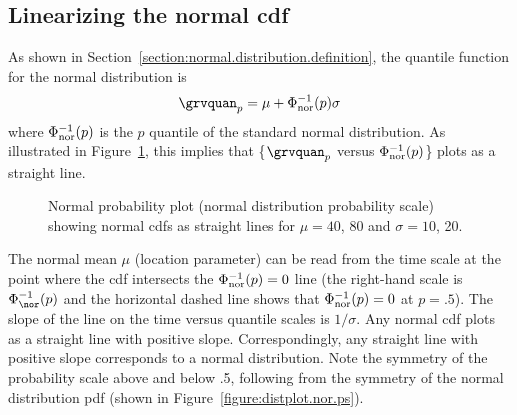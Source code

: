 \subsection{Linearizing the normal cdf}
As shown in Section~\ref{section:normal.distribution.definition}, the
quantile function for the normal distribution is
\begin{displaymath}
\grvquan_{p}= \mu  + \Phi_{{\rm nor}}^{-1}(p) \sigma
\end{displaymath}
where
$\Phi^{-1}_{{\rm nor}}(p)$ is the $p$ quantile of the standard normal
distribution.
As illustrated in Figure~\ref{figure:linear.normal.ps}, this implies
that \{$\grvquan_{p}$ 
versus $\Phi_{{\rm nor}}^{-1}(p)$\} plots as a straight
line. 
\begin{figure}
\caption{Normal probability plot (normal distribution probability scale)
showing normal cdfs as straight lines for $\mu=40$, 80 and
$\sigma=10$, 20.}
\label{figure:linear.normal.ps}
\end{figure}
The normal mean $\mu$ (location parameter)
can be read from the time scale at the point where the cdf
intersects the $\Phi^{-1}_{{\rm nor}}(p)=0$ line
(the right-hand scale is $\Phi^{-1}_{\nor}(p)$ and
the horizontal dashed line
shows that $\Phi^{-1}_{{\rm nor}}(p)=0$ at $p =.5$).
The slope of the line on the time versus quantile scales is $1/\sigma$.
Any normal cdf plots as a straight line with
positive slope.  Correspondingly, any straight line with positive
slope corresponds to a normal distribution.
Note the symmetry of the probability 
scale above and below .5,  following from 
the symmetry of the normal distribution pdf (shown in
Figure~\ref{figure:distplot.nor.ps}).

